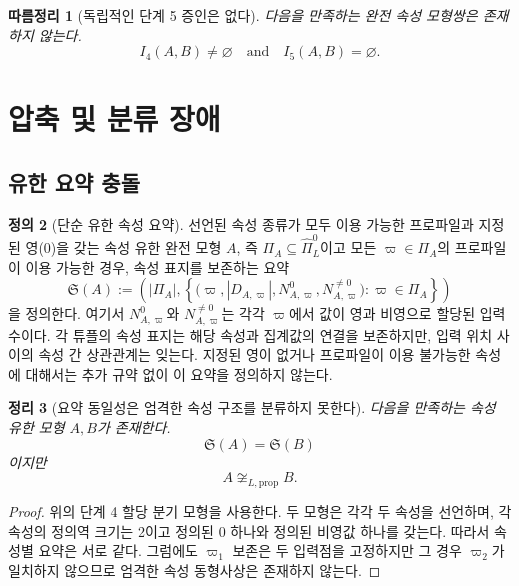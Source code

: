 \documentclass[11pt]{article}
\newcommand{\PiZero}{\widehat{\Pi}_{L}^{0}}
\newtheorem{theorem}{정리}[section]
\newtheorem{corollary}[theorem]{따름정리}
\theoremstyle{definition}
\newtheorem{definition}[theorem]{정의}
\theoremstyle{remark}
\begin{document}
\begin{corollary}[독립적인 단계 5 증인은 없다]
다음을 만족하는 완전 속성 모형쌍은 존재하지 않는다.
\[
I_4(A,B)\neq\varnothing
\quad\text{and}\quad
I_5(A,B)=\varnothing.
\]
\end{corollary}

\section{압축 및 분류 장애}
\label{sec:compression}

\subsection{유한 요약 충돌}

\begin{definition}[단순 유한 속성 요약]
선언된 속성 종류가 모두 이용 가능한 프로파일과 지정된 영(0)을 갖는 속성 유한 완전 모형 \(A\), 즉
\(\Pi_A\subseteq\PiZero\)이고 모든 \(\varpi\in\Pi_A\)의 프로파일이 이용 가능한 경우, 속성 표지를 보존하는 요약
\[
\mathfrak S(A):=
\left(
|\Pi_A|,
\left\{
\bigl(\varpi,|D_{A,\varpi}|,N^0_{A,\varpi},N^{\neq0}_{A,\varpi}\bigr)
:\varpi\in\Pi_A
\right\}
\right)
\]
을 정의한다.
여기서 \(N^0_{A,\varpi}\)와 \(N^{\neq0}_{A,\varpi}\)는 각각 \(\varpi\)에서 값이 영과 비영으로 할당된 입력 수이다.
각 튜플의 속성 표지는 해당 속성과 집계값의 연결을 보존하지만, 입력 위치 사이의 속성 간 상관관계는 잊는다.
지정된 영이 없거나 프로파일이 이용 불가능한 속성에 대해서는 추가 규약 없이 이 요약을 정의하지 않는다.
\end{definition}

\begin{theorem}[요약 동일성은 엄격한 속성 구조를 분류하지 못한다]
\label{thm:compression}
다음을 만족하는 속성 유한 모형 \(A,B\)가 존재한다.
\[
\mathfrak S(A)=\mathfrak S(B)
\]
이지만
\[
A\not\cong_{L,\mathrm{prop}}B.
\]
\end{theorem}

\begin{proof}
위의 단계 4 할당 분기 모형을 사용한다.
두 모형은 각각 두 속성을 선언하며, 각 속성의 정의역 크기는 2이고 정의된 0 하나와 정의된 비영값 하나를 갖는다.
따라서 속성별 요약은 서로 같다.
그럼에도 \(\varpi_1\) 보존은 두 입력점을 고정하지만 그 경우 \(\varpi_2\)가 일치하지 않으므로 엄격한 속성 동형사상은 존재하지 않는다.
\end{proof}
\end{document}
